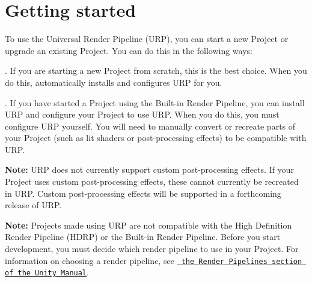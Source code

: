 \chapter{Getting started}
\hypertarget{md__hey_tea_9_2_library_2_package_cache_2com_8unity_8render-pipelines_8universal_0d14_80_88_2_do3016daf19cd96ed282a5bfc133e33eb3}{}\label{md__hey_tea_9_2_library_2_package_cache_2com_8unity_8render-pipelines_8universal_0d14_80_88_2_do3016daf19cd96ed282a5bfc133e33eb3}
\label{md__hey_tea_9_2_library_2_package_cache_2com_8unity_8render-pipelines_8universal_0d14_80_88_2_do3016daf19cd96ed282a5bfc133e33eb3_autotoc_md2169}%
%
 To use the Universal Render Pipeline (URP), you can start a new Project or upgrade an existing Project. You can do this in the following ways\+:


\begin{DoxyItemize}
\item {}. If you are starting a new Project from scratch, this is the best choice. When you do this,  automatically installs and configures URP for you.
\item {}. If you have started a Project using the Built-\/in Render Pipeline, you can install URP and configure your Project to use URP. When you do this, you must configure URP yourself. You will need to manually convert or recreate parts of your Project (such as lit shaders or post-\/processing effects) to be compatible with URP.
\end{DoxyItemize}

{\bfseries{Note\+:}} URP does not currently support custom post-\/processing effects. If your Project uses custom post-\/processing effects, these cannot currently be recreated in URP. Custom post-\/processing effects will be supported in a forthcoming release of URP.

{\bfseries{Note\+:}} Projects made using URP are not compatible with the High Definition Render Pipeline (HDRP) or the Built-\/in Render Pipeline. Before you start development, you must decide which render pipeline to use in your Project. For information on choosing a render pipeline, see \href{https://docs.unity3d.com/2019.3/Documentation/Manual/render-pipelines.html}{\texttt{ the Render Pipelines section of the Unity Manual}}. 